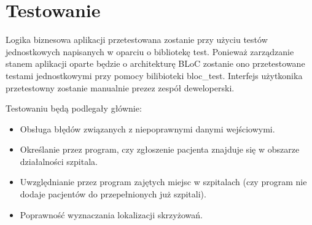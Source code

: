 \documentclass{article}
\begin{document}
\section{Testowanie}
Logika biznesowa aplikacji przetestowana zostanie przy użyciu testów jednostkowych napisanych w oparciu o bibliotekę test. Ponieważ zarządzanie stanem aplikacji oparte będzie o architekturę BLoC zostanie ono przetestowane testami jednostkowymi przy pomocy bilibioteki bloc\_test. Interfejs użytkonika przetestowny zostanie manualnie prezez zespół deweloperski.

\newpage
Testowaniu będą podlegały głównie:
\begin{itemize}
    \item Obsługa błędów związanych z niepoprawnymi danymi wejściowymi.
    \item Określanie przez program, czy zgłoszenie pacjenta znajduje się w obszarze działalności szpitala.
    \item Uwzględnianie przez program zajętych miejsc w szpitalach (czy program nie dodaje pacjentów do przepełnionych już szpitali).
    \item Poprawność wyznaczania lokalizacji skrzyżowań.
\end{itemize}
\end{document}
